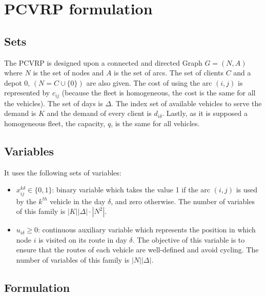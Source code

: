 \documentclass[preprint,review,12pt]{elsarticle}
\begin{document}
\section{PCVRP formulation}

\subsection{Sets}
The PCVRP is designed upon a connected and directed Graph $G = (N,A)$ where $N$ is the set of nodes and $A$ is the set of arcs. The set of clients $C$ and a depot $0$, $(N=C \cup \{0\})$ are also given. The cost of using the arc $(i,j)$ is represented by $c_{ij}$ (because the fleet is homogeneous, the cost is the same for all the vehicles). The set of days is $\Delta$. The index set of available vehicles to serve the demand is $K$ and the demand of every client is $d_{i\delta}$. Lastly, as it is supposed a homogeneous fleet, the capacity, $q$, is the same for all vehicles.

\subsection{Variables}
It uses the following sets of variables:

\begin{itemize}
	\item  $x_{ij}^{k\delta}  \in  \{ 0,1 \}$: binary variable which takes the value 1 if the arc $(i,j)$ is used by the $k^{th}$ vehicle in the day $\delta$, and zero otherwise. The number of variables of this family is $|K||\Delta|\cdot|N^2|$.
	\item $u_{i\delta} \geq 0$: continuous auxiliary variable which represents the position in which node $i$ is visited on its route in day $\delta$. The objective of this variable is to ensure that the routes of each vehicle are well-defined and avoid cycling. The number of variables of this family is $|N||\Delta|$.
\end{itemize}

\subsection{Formulation}
\end{document}
